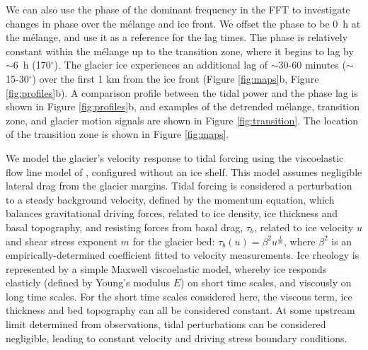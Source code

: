 \documentclass[review]{igs}
\begin{document}
We can also use the phase of the dominant frequency in the FFT to investigate changes in phase over the m\'elange and ice front. We offset the phase to be 0~h at the m\'elange, and use it as a reference for the lag times. The phase is relatively constant within the m\'elange up to the transition zone, where it begins to lag by $\sim$6~h (170$^{\circ}$). The glacier ice experiences an additional lag of $\sim$30-60 minutes ($\sim$15-30$^{\circ}$) over the first 1 km from the ice front (Figure \ref{fig:maps}b, Figure \ref{fig:profiles}b). A comparison profile between the tidal power and the phase lag is shown in Figure \ref{fig:profiles}b, and examples of the detrended m\'elange, transition zone, and glacier motion signals are shown in Figure \ref{fig:transition}. The location of the transition zone is shown in Figure \ref{fig:maps}.

We model the glacier’s velocity response to tidal forcing using the viscoelastic flow line model of \citet{walker2012viscoelastic,walker2014ice}, configured without an ice shelf. This model assumes negligible lateral drag from the glacier margins.   Tidal forcing is considered a perturbation to a steady background velocity, defined by the momentum equation, which balances gravitational driving forces, related to ice density, ice thickness and basal topography,  and resisting forces from basal drag, $\tau_b$, related to ice velocity $u$ and shear stress exponent $m$ for the glacier bed: $\tau_b (u)=\beta^2 u^{\frac{1}{m}}$, where $\beta^2$ is an empirically-determined coefficient fitted to velocity measurements. Ice rheology is represented by a simple Maxwell viscoelastic model, whereby ice responds elasticly (defined by Young’s modulus $E$) on short time scales, and viscously on long time scales.  For the short time scales considered here, the viscous term, ice thickness and bed topography can all be considered constant.  At some upstream limit determined from observations, tidal perturbations can be considered negligible, leading to constant velocity and driving stress boundary conditions.  
\end{document}

